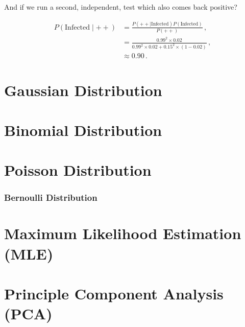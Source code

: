 \noindent And if we run a second, independent, test which also comes back positive?

\begin{equation}\label{eq:stats:BayesEx2}
\begin{split}
P\left(\text{Infected} \mid ++\right) &= \frac{P\left(++ \mid \text{Infected}\right) P\left(\text{Infected}\right)}{P\left(++\right)}\,, \\
&= \frac{\num{0.99}^{2} \times \num{0.02}}{\num{0.99}^{2} \times \num{0.02} + \num{0.15}^{2} \times \left(1-\num{0.02}\right)}\,, \\
&\approx \num{0.90}\,.
\end{split}
\end{equation}

\section{Gaussian Distribution}
\label{stats:gaus}

\section{Binomial Distribution}
\label{stats:binomial}

\section{Poisson Distribution}
\label{stats:poisson}

\subsubsection{Bernoulli Distribution}
\label{stats:poisson:bernoulli}

\section{Maximum Likelihood Estimation (MLE)}
\label{stats:MLE}


\section{Principle Component Analysis (PCA)}
\label{stats:PCA}

